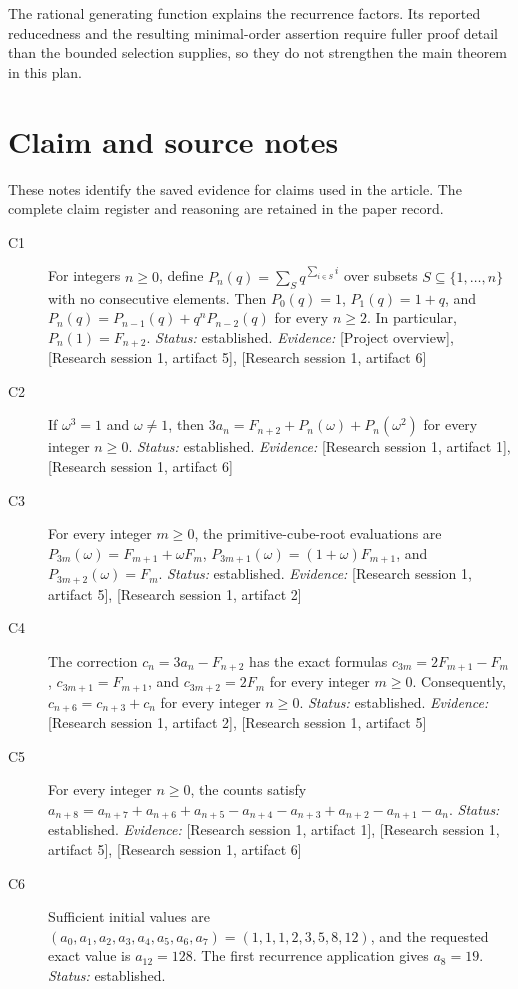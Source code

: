 \documentclass[11pt]{article}
\begin{document}
The rational generating function explains the recurrence factors. Its reported reducedness and the resulting minimal-order assertion require fuller proof detail than the bounded selection supplies, so they do not strengthen the main theorem in this plan.

\appendix
\section{Claim and source notes}
These notes identify the saved evidence for claims used in the article. The complete claim register and reasoning are retained in the paper record.
\begin{sloppypar}
\small
\begin{description}
\item[C1] For integers $n\geq 0$, define $P_n(q)=\sum_S q^{\sum_{i\in S}i}$ over subsets $S\subseteq\{1,\ldots,n\}$ with no consecutive elements. Then $P_0(q)=1$, $P_1(q)=1+q$, and $P_n(q)=P_{n-1}(q)+q^nP_{n-2}(q)$ for every $n\geq 2$. In particular, $P_n(1)=F_{n+2}$. \textit{Status: }established.
\textit{Evidence: }[Project overview], [Research session 1, artifact 5], [Research session 1, artifact 6]
\item[C2] If $\omega^3=1$ and $\omega\ne 1$, then $3a_n=F_{n+2}+P_n(\omega)+P_n(\omega^2)$ for every integer $n\geq 0$. \textit{Status: }established.
\textit{Evidence: }[Research session 1, artifact 1], [Research session 1, artifact 6]
\item[C3] For every integer $m\geq 0$, the primitive-cube-root evaluations are $P_{3m}(\omega)=F_{m+1}+\omega F_m$, $P_{3m+1}(\omega)=(1+\omega)F_{m+1}$, and $P_{3m+2}(\omega)=F_m$. \textit{Status: }established.
\textit{Evidence: }[Research session 1, artifact 5], [Research session 1, artifact 2]
\item[C4] The correction $c_n=3a_n-F_{n+2}$ has the exact formulas $c_{3m}=2F_{m+1}-F_m$, $c_{3m+1}=F_{m+1}$, and $c_{3m+2}=2F_m$ for every integer $m\geq 0$. Consequently, $c_{n+6}=c_{n+3}+c_n$ for every integer $n\geq 0$. \textit{Status: }established.
\textit{Evidence: }[Research session 1, artifact 2], [Research session 1, artifact 5]
\item[C5] For every integer $n\geq 0$, the counts satisfy $a_{n+8}=a_{n+7}+a_{n+6}+a_{n+5}-a_{n+4}-a_{n+3}+a_{n+2}-a_{n+1}-a_n$. \textit{Status: }established.
\textit{Evidence: }[Research session 1, artifact 1], [Research session 1, artifact 5], [Research session 1, artifact 6]
\item[C6] Sufficient initial values are $(a_0,a_1,a_2,a_3,a_4,a_5,a_6,a_7)=(1,1,1,2,3,5,8,12)$, and the requested exact value is $a_{12}=128$. The first recurrence application gives $a_8=19$. \textit{Status: }established.

\end{description}
\end{sloppypar}
\end{document}
